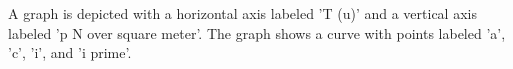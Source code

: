 A graph is depicted with a horizontal axis labeled 'T (u)' and a vertical axis labeled 'p N over square meter'. The graph shows a curve with points labeled 'a', 'c', 'i', and 'i prime'.